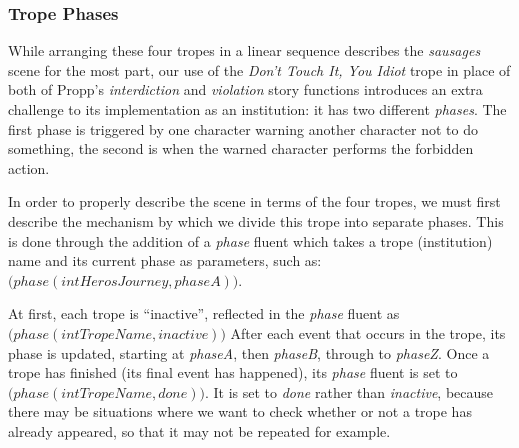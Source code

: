 \documentclass[11pt]{report}
\begin{document}
\subsubsection{Trope Phases}
\label{sec:trope-phases}

While arranging these four tropes in a linear sequence describes the
\emph{sausages} scene for the most part, our use of the \emph{Don't Touch It, You Idiot} trope in place of both of
Propp's \emph{interdiction} and \emph{violation} story functions introduces an
extra challenge to its implementation as an institution: it has two different
\emph{phases}. The first phase is triggered by one character warning another
character not to do something, the second is when the warned character performs
the forbidden action.

In order to properly describe the scene in terms of the four tropes, we must
first describe the mechanism by which we divide this trope into separate phases.
This is done through the addition of a \emph{phase} fluent which takes a trope
(institution) name and its current phase as parameters, such as:
$\mathtt(phase(intHerosJourney, phaseA))$.

At first, each trope is ``inactive'', reflected in the \emph{phase} fluent as
$\mathtt(phase(intTropeName, inactive))$ After each event that occurs in the
trope, its phase is updated, starting at \emph{phaseA}, then \emph{phaseB},
through to \emph{phaseZ}. Once a trope has finished (its final event has
happened), its \emph{phase} fluent is set to $\mathtt(phase(intTropeName,
done))$. It is set to \emph{done} rather than \emph{inactive}, because there may
be situations where we want to check whether or not a trope has already
appeared, so that it may not be repeated for example.
\end{document}
